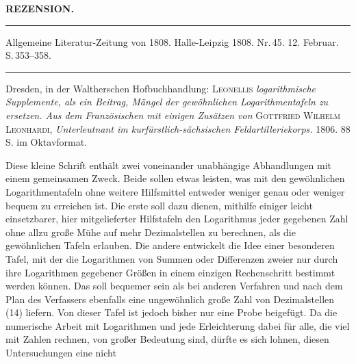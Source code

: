 \begin{center}
\textbf{REZENSION.}
\end{center}

\medskip
\noindent\rule{\linewidth}{.3pt}

\noindent Allgemeine Literatur-Zeitung von 1808. Halle-Leipzig 1808. Nr.\,45. 12. Februar. S.\,353--358.

\noindent\rule{\linewidth}{.3pt}
\medskip

Dresden, in der Waltherschen Hofbuchhandlung: \textsc{Leonellis} \emph{logarithmische Supplemente, als ein Beitrag, Mängel der gewöhnlichen Logarithmentafeln zu ersetzen. Aus dem Französischen mit einigen Zusätzen von} \textsc{Gottfried Wilhelm Leonhardi}, \emph{Unterleutnant im kurfürstlich-sächsischen Feldartilleriekorps.} 1806. 88 S. im Oktavformat.

Diese kleine Schrift enthält zwei voneinander unabhängige Abhandlungen mit einem gemeinsamen Zweck. Beide sollen etwas leisten, was mit den gewöhnlichen Logarithmentafeln ohne weitere Hilfsmittel entweder weniger genau oder weniger bequem zu erreichen ist. Die erste soll dazu dienen, mithilfe einiger leicht einsetzbarer, hier mitgelieferter Hilfstafeln den Logarithmus jeder gegebenen Zahl ohne allzu große Mühe auf mehr Dezimalstellen zu berechnen, als die gewöhnlichen Tafeln erlauben. Die andere entwickelt die Idee einer besonderen Tafel, mit der die Logarithmen von Summen oder Differenzen zweier nur durch ihre Logarithmen gegebener Größen in einem einzigen Rechenschritt bestimmt werden können. Das soll bequemer sein als bei anderen Verfahren und nach dem Plan des Verfassers ebenfalls eine ungewöhnlich große Zahl von Dezimalstellen (14) liefern. Von dieser Tafel ist jedoch bisher nur eine Probe beigefügt. Da die numerische Arbeit mit Logarithmen und jede Erleichterung dabei für alle, die viel mit Zahlen rechnen, von großer Bedeutung sind, dürfte es sich lohnen, diesen Untersuchungen eine nicht
